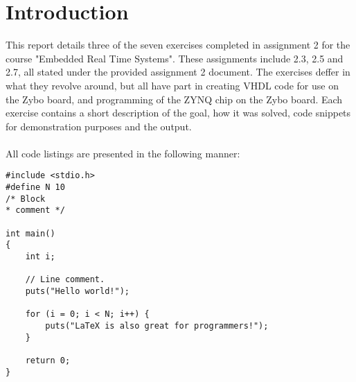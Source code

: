 \section{Introduction}

This report details three of the seven exercises completed in assignment 2 for the course "Embedded Real Time Systems". These assignments include 2.3, 2.5 and 2.7, all stated under the provided assignment 2 document. The exercises deffer in what they revolve around, but all have part in creating VHDL code for use on the Zybo board, and programming of the ZYNQ chip on the Zybo board. Each exercise contains a short description of the goal, how it was solved, code snippets for demonstration purposes and the output. \\\\
All code listings are presented in the following manner:
\begin{lstlisting}[style=customc++, caption=Example listing.]
#include <stdio.h>
#define N 10
/* Block
* comment */

int main()
{
	int i;

	// Line comment.
	puts("Hello world!");

	for (i = 0; i < N; i++) {
		puts("LaTeX is also great for programmers!");
	}

	return 0;
}
\end{lstlisting}